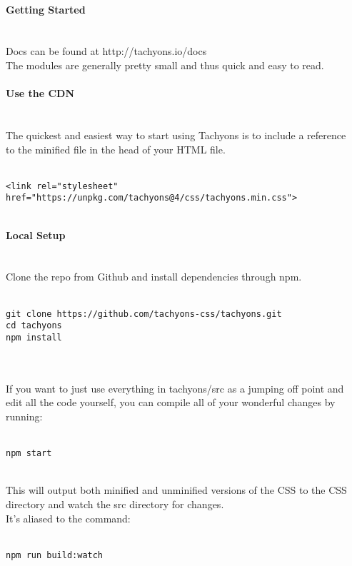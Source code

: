 \documentclass{article}
\begin{document}
\\
{\noindent \LARGE \textbf{Getting Started}}\\\\
\\
Docs can be found at http://tachyons.io/docs\\
The modules are generally pretty small and thus quick and easy to read.\\
\\
{\noindent \Large \textbf{Use the CDN}}\\\\
\\
The quickest and easiest way to start using Tachyons is to include a reference\\
to the minified file in the head of your HTML file.\\
\\
\begin{lstlisting}
<link rel="stylesheet" href="https://unpkg.com/tachyons@4/css/tachyons.min.css">
\end{lstlisting}
\\
{\noindent \Large \textbf{Local Setup}}\\\\
\\
Clone the repo from Github and install dependencies through npm.\\
\\
\begin{lstlisting}
git clone https://github.com/tachyons-css/tachyons.git
cd tachyons
npm install
\end{lstlisting}
\\
\\
If you want to just use everything in tachyons/src as a jumping off point and\\
edit all the code yourself, you can compile all of your wonderful changes by\\
running:\\
\\
\begin{lstlisting}npm start\end{lstlisting}
\\
This will output both minified and unminified versions of the CSS to the CSS directory and watch the src directory for changes.\\
It's aliased to the command:\\
\\
\begin{lstlisting}npm run build:watch\end{lstlisting}
\end{document}
